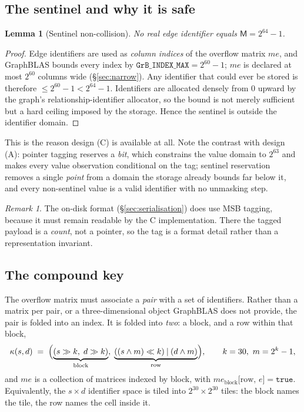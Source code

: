 \documentclass[11pt,a4paper]{article}
\theoremstyle{plain}
\newtheorem{lemma}[theorem]{Lemma}
\theoremstyle{definition}
\theoremstyle{remark}
\newtheorem{remark}[theorem]{Remark}
\newcommand{\M}{\mathsf{M}}
\begin{document}
\subsection{The sentinel and why it is safe}

\begin{lemma}[Sentinel non-collision]
\label{lem:sentinel}
No real edge identifier equals $\M = 2^{64}-1$.
\end{lemma}

\begin{proof}
Edge identifiers are used as \emph{column indices} of the overflow matrix
$me$, and GraphBLAS bounds every index by
$\texttt{GrB\_INDEX\_MAX} = 2^{60}-1$; $me$ is declared at most $2^{60}$
columns wide (\S\ref{sec:narrow}). Any identifier that could ever be stored is
therefore $\le 2^{60}-1 < 2^{64}-1$. Identifiers are allocated densely from $0$ upward by
the graph's relationship-identifier allocator, so the bound is not merely
sufficient but a hard ceiling imposed by the storage. Hence the sentinel is
outside the identifier domain.
\end{proof}

This is the reason design (C) is available at all. Note the contrast with
design (A): pointer tagging reserves a \emph{bit}, which constrains the value
domain to $2^{63}$ and makes every value observation conditional on the tag;
sentinel reservation removes a single \emph{point} from a domain the storage
already bounds far below it, and every non-sentinel value is a valid
identifier with no unmasking step.

\begin{remark}
The on-disk format (\S\ref{sec:serialisation}) does use MSB tagging, because
it must remain readable by the C implementation. There the tagged payload is a
\emph{count}, not a pointer, so the tag is a format detail rather than a
representation invariant.
\end{remark}

\subsection{The compound key}
\label{sec:compound}

The overflow matrix must associate a \emph{pair} with a set of identifiers.
Rather than a matrix per pair, or a three-dimensional object GraphBLAS does
not provide, the pair is folded into an index. It is folded into \emph{two}:
a block, and a row within that block,
\[
  \kappa(s,d) \;=\;
    \Bigl(\underbrace{(s \gg k,\; d \gg k)}_{\text{block}},\;
          \underbrace{((s \wedge m) \ll k) \mathbin{|} (d \wedge m)}_{\text{row}}\Bigr),
  \qquad k = 30,\ m = 2^{k}-1 ,
\]
and $me$ is a collection of matrices indexed by block, with
$me_{\text{block}}\bigl[\text{row},\, e\bigr] = \texttt{true}$. Equivalently,
the $s \times d$ identifier space is tiled into $2^{30} \times 2^{30}$ tiles:
the block names the tile, the row names the cell inside it.
\end{document}
